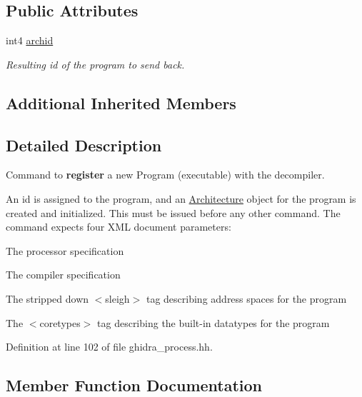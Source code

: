 \subsection*{Public Attributes}
\begin{DoxyCompactItemize}
\item 
int4 \mbox{\hyperlink{class_register_program_a1b29c81cd1e53d56e6521e5ad2f54823}{archid}}
\begin{DoxyCompactList}\small\item\em Resulting id of the program to send back. \end{DoxyCompactList}\end{DoxyCompactItemize}
\subsection*{Additional Inherited Members}


\subsection{Detailed Description}
Command to {\bfseries{register}} a new Program (executable) with the decompiler. 

An id is assigned to the program, and an \mbox{\hyperlink{class_architecture}{Architecture}} object for the program is created and initialized. This must be issued before any other command. The command expects four X\+ML document parameters\+:
\begin{DoxyItemize}
\item The processor specification
\item The compiler specification
\item The stripped down $<$sleigh$>$ tag describing address spaces for the program
\item The $<$coretypes$>$ tag describing the built-\/in datatypes for the program 
\end{DoxyItemize}

Definition at line 102 of file ghidra\+\_\+process.\+hh.



\subsection{Member Function Documentation}
\mbox{\label{class_register_program_ae79c022fba3244f9969aa007058f4b53}} 
